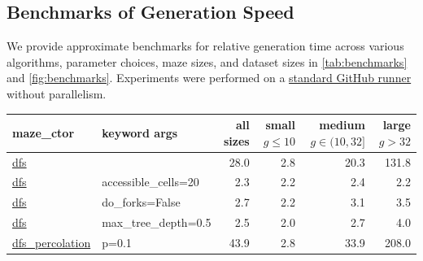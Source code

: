 \documentclass[10pt,a4paper,onecolumn]{article}
\begin{document}
\hypertarget{benchmarks}{%
\subsection{Benchmarks of Generation Speed}\label{benchmarks}}

We provide approximate benchmarks for relative generation time across
various algorithms, parameter choices, maze sizes, and dataset sizes in
\autoref{tab:benchmarks} and \autoref{fig:benchmarks}. Experiments were
performed on a
\href{https://docs.github.com/en/actions/using-github-hosted-runners/using-github-hosted-runners/about-github-hosted-runners#standard-github-hosted-runners-for-public-repositories}{standard GitHub runner}
without parallelism.

\begin{table}[H]
\centering
\begin{tabular}{|ll|r|rrr|}
  \hline
  maze\_ctor
          & keyword args           & all sizes 
                                              & \makecell{small \\ $g \leq 10$} 
                                                         & \makecell{medium \\ $g \in (10, 32]$} 
                                                                    & \makecell{large \\ $g > 32$} \\
  \hline\hline
  \href{https://understanding-search.github.io/maze-dataset/maze_dataset.html#LatticeMazeGenerators.gen_dfs}{dfs}
          &                        &   28.0   &    2.8   &   20.3   &  131.8   \\
  \href{https://understanding-search.github.io/maze-dataset/maze_dataset.html#LatticeMazeGenerators.gen_dfs}{dfs}
          & accessible\_cells=20   &    2.3   &    2.2   &    2.4   &    2.2   \\
  \href{https://understanding-search.github.io/maze-dataset/maze_dataset.html#LatticeMazeGenerators.gen_dfs}{dfs}
          & do\_forks=False        &    2.7   &    2.2   &    3.1   &    3.5   \\
  \href{https://understanding-search.github.io/maze-dataset/maze_dataset.html#LatticeMazeGenerators.gen_dfs}{dfs}
          & max\_tree\_depth=0.5   &    2.5   &    2.0   &    2.7   &    4.0   \\
  \href{https://understanding-search.github.io/maze-dataset/maze_dataset.html#LatticeMazeGenerators.gen_dfs_percolation}{dfs\_percolation}
          & p=0.1                  &   43.9   &    2.8   &   33.9   &  208.0   \\

\end{tabular}
\end{table}
\end{document}
